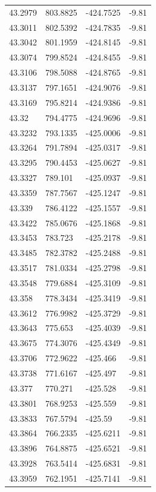 \begin{table}[H]
\begin{tabular}{llll}
43.2979 & 803.8825 & -424.7525 & -9.81 \\
43.3011 & 802.5392 & -424.7835 & -9.81 \\
43.3042 & 801.1959 & -424.8145 & -9.81 \\
43.3074 & 799.8524 & -424.8455 & -9.81 \\
43.3106 & 798.5088 & -424.8765 & -9.81 \\
43.3137 & 797.1651 & -424.9076 & -9.81 \\
43.3169 & 795.8214 & -424.9386 & -9.81 \\
43.32 & 794.4775 & -424.9696 & -9.81 \\
43.3232 & 793.1335 & -425.0006 & -9.81 \\
43.3264 & 791.7894 & -425.0317 & -9.81 \\
43.3295 & 790.4453 & -425.0627 & -9.81 \\
43.3327 & 789.101 & -425.0937 & -9.81 \\
43.3359 & 787.7567 & -425.1247 & -9.81 \\
43.339 & 786.4122 & -425.1557 & -9.81 \\
43.3422 & 785.0676 & -425.1868 & -9.81 \\
43.3453 & 783.723 & -425.2178 & -9.81 \\
43.3485 & 782.3782 & -425.2488 & -9.81 \\
43.3517 & 781.0334 & -425.2798 & -9.81 \\
43.3548 & 779.6884 & -425.3109 & -9.81 \\
43.358 & 778.3434 & -425.3419 & -9.81 \\
43.3612 & 776.9982 & -425.3729 & -9.81 \\
43.3643 & 775.653 & -425.4039 & -9.81 \\
43.3675 & 774.3076 & -425.4349 & -9.81 \\
43.3706 & 772.9622 & -425.466 & -9.81 \\
43.3738 & 771.6167 & -425.497 & -9.81 \\
43.377 & 770.271 & -425.528 & -9.81 \\
43.3801 & 768.9253 & -425.559 & -9.81 \\
43.3833 & 767.5794 & -425.59 & -9.81 \\
43.3864 & 766.2335 & -425.6211 & -9.81 \\
43.3896 & 764.8875 & -425.6521 & -9.81 \\
43.3928 & 763.5414 & -425.6831 & -9.81 \\
43.3959 & 762.1951 & -425.7141 & -9.81 \\

\end{tabular}
\end{table}
